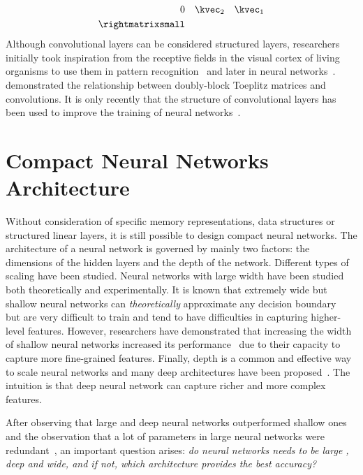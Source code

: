 {\begin{align}
    0 &  &  & \kvec_{2} & \kvec_{1}  \\
  \rightmatrixsmall
\end{align}
Although convolutional layers can be considered structured layers, researchers initially took inspiration from the receptive fields in the visual cortex of living organisms to use them in pattern recognition~\cite{hubel1959receptive,hubel1968receptive} and later in neural networks~\cite{fukushima1982neocognitron}.
\citet{jain1989fundamentals} demonstrated the relationship between doubly-block Toeplitz matrices and convolutions.
It is only recently that the structure of convolutional layers has been used to improve the training of neural networks~\cite{sedghi2018singular}.


\section{Compact Neural Networks Architecture}
\label{section:p1-ch3-compact_neural_networks_architecture}


Without consideration of specific memory representations, data structures or structured linear layers, it is still possible to design compact neural networks.
The architecture of a neural network is governed by mainly two factors: the dimensions of the hidden layers and the depth of the network.
Different types of scaling have been studied.
Neural networks with large width have been studied both theoretically and experimentally.
It is known that extremely wide but shallow neural networks can \emph{theoretically} approximate any decision boundary~\cite{cybenko1989approximation} but are very difficult to train and tend to have difficulties in capturing higher-level features. 
However, researchers have demonstrated that increasing the width of shallow neural networks increased its performance~\cite{howard2017mobilenets,sandler2018mobilenetv2,tan2019mnasnet,zagoruyko2016wide} due to their capacity to capture more fine-grained features. 
Finally, depth is a common and effective way to scale neural networks and many deep architectures have been proposed~\cite{he2016deep, huang2016deep, szegedy2016rethinking,szegedy2017inception,xiao2018dynamical}. 
The intuition is that deep neural network can capture richer and more complex features.

After observing that large and deep neural networks outperformed shallow ones \cite{huang2019gpipe,brown2020language} and the observation that a lot of parameters in large neural networks were redundant~\cite{dai2018compressing,frankle2018lottery}, an important question arises: \emph{do neural networks needs to be large \ie, deep and wide, and if not, which architecture provides the best accuracy?} 

}
